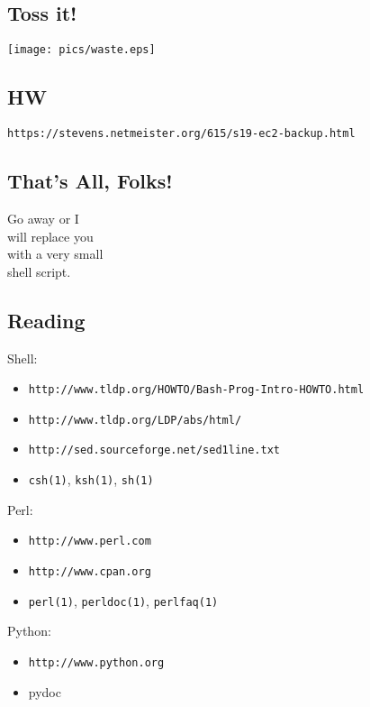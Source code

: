 \documentclass[xga]{xdvislides}
\begin{document}
\subsection{Toss it!}
\vspace*{\fill}
\begin{center}
	\texttt{[image: pics/waste.eps]}
\end{center}
\vspace*{\fill}

\subsection{HW}
\vspace{.5in}
\begin{center}
\begin{verbatim}
https://stevens.netmeister.org/615/s19-ec2-backup.html
\end{verbatim}
\end{center}

\subsection{That's All, Folks!}
\vspace*{\fill}
\Huge
\begin{center}
Go away or I \\
will replace you \\
with a very small \\
shell script.
\end{center}
\Normalsize
\vspace*{\fill}


\subsection{Reading}
Shell:
\begin{itemize}
	\item \verb+http://www.tldp.org/HOWTO/Bash-Prog-Intro-HOWTO.html+
	\item \verb+http://www.tldp.org/LDP/abs/html/+
	\item \verb+http://sed.sourceforge.net/sed1line.txt+
	\item \verb+csh(1)+, \verb+ksh(1)+, \verb+sh(1)+
\end{itemize}
Perl:
\begin{itemize}
	\item \verb+http://www.perl.com+
	\item \verb+http://www.cpan.org+
	\item \verb+perl(1)+, \verb+perldoc(1)+,
	\verb+perlfaq(1)+
\end{itemize}
Python:
\begin{itemize}
	\item \verb+http://www.python.org+
	\item pydoc
\end{itemize}
\end{document}
